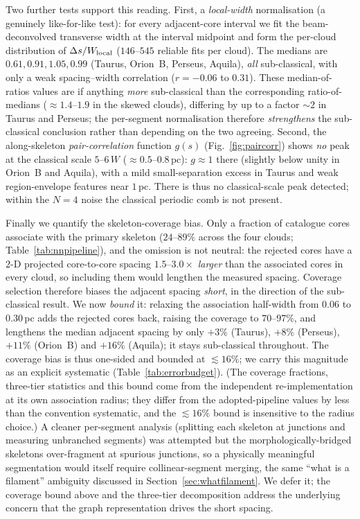 \documentclass[usenatbib,twoside,twocolumn]{mnras}
\begin{document}
Two further tests support this reading. First, a \emph{local-width} normalisation (a genuinely like-for-like test): for every adjacent-core interval we fit the beam-deconvolved transverse width at the interval midpoint and form the per-cloud distribution of $\Delta s/W_{\rm local}$ ($146$--$545$ reliable fits per cloud). The medians are $0.61,0.91,1.05,0.99$ (Taurus, Orion~B, Perseus, Aquila), \emph{all} sub-classical, with only a weak spacing--width correlation ($r=-0.06$ to $0.31$). These median-of-ratios values are if anything \emph{more} sub-classical than the corresponding ratio-of-medians ($\approx1.4$--$1.9$ in the skewed clouds), differing by up to a factor $\sim2$ in Taurus and Perseus; the per-segment normalisation therefore \emph{strengthens} the sub-classical conclusion rather than depending on the two agreeing. Second, the along-skeleton \emph{pair-correlation} function $g(s)$ (Fig.~\ref{fig:paircorr}) shows \emph{no} peak at the classical scale $5$--$6\,W$ ($\approx0.5$--$0.8$\,pc): $g\approx1$ there (slightly below unity in Orion~B and Aquila), with a mild small-separation excess in Taurus and weak region-envelope features near $1$\,pc. There is thus no classical-scale peak detected; within the $N=4$ noise the classical periodic comb is not present.

Finally we quantify the skeleton-coverage bias. Only a fraction of catalogue cores associate with the primary skeleton ($24$--$89\%$ across the four clouds; Table~\ref{tab:nnpipeline}), and the omission is not neutral: the rejected cores have a $2$-D projected core-to-core spacing $1.5$--$3.0\times$ \emph{larger} than the associated cores in every cloud, so including them would lengthen the measured spacing. Coverage selection therefore biases the adjacent spacing \emph{short}, in the direction of the sub-classical result. We now \emph{bound} it: relaxing the association half-width from $0.06$ to $0.30$\,pc adds the rejected cores back, raising the coverage to $70$--$97\%$, and lengthens the median adjacent spacing by only $+3\%$ (Taurus), $+8\%$ (Perseus), $+11\%$ (Orion~B) and $+16\%$ (Aquila); it stays sub-classical throughout. The coverage bias is thus one-sided and bounded at $\lesssim16\%$; we carry this magnitude as an explicit systematic (Table~\ref{tab:errorbudget}). (The coverage fractions, three-tier statistics and this bound come from the independent re-implementation at its own association radius; they differ from the adopted-pipeline values by less than the convention systematic, and the $\lesssim16\%$ bound is insensitive to the radius choice.) A cleaner per-segment analysis (splitting each skeleton at junctions and measuring unbranched segments) was attempted but the morphologically-bridged skeletons over-fragment at spurious junctions, so a physically meaningful segmentation would itself require collinear-segment merging, the same ``what is a filament'' ambiguity discussed in Section~\ref{sec:whatfilament}. We defer it; the coverage bound above and the three-tier decomposition address the underlying concern that the graph representation drives the short spacing.
\end{document}
